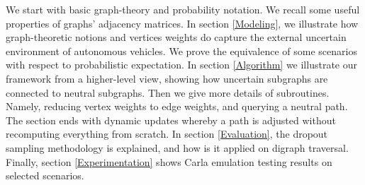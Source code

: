 We start with basic graph-theory and probability notation. We recall some useful properties of graphs' adjacency matrices. In section \ref{Modeling}, we illustrate how graph-theoretic notions and vertices weights do capture the external uncertain environment of autonomous vehicles. We prove the equivalence of some scenarios with respect to probabilistic expectation. In section \ref{Algorithm} we illustrate our framework from a higher-level view, showing how uncertain subgraphs are connected to neutral subgraphs. Then we give more details of subroutines. Namely, reducing vertex weights to edge weights, and querying a neutral path. The section ends with dynamic updates whereby a path is adjusted without recomputing everything from scratch. In section \ref{Evaluation}, the dropout sampling methodology is explained, and how is it applied on digraph traversal. Finally, section \ref{Experimentation} shows Carla emulation testing results on selected scenarios.
